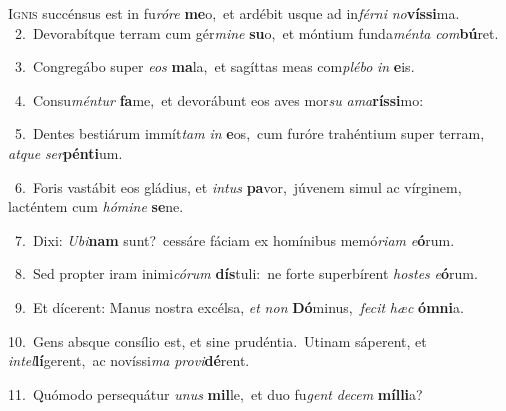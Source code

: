 \lettrine{\initial\textcolor{\initialcolor}{I}}{gnis} succénsus est in fu\-\textit{ró}\-\textit{re} \textbf{me}\-o,~\star et ardébit usque ad in\-\textit{fér}\-\textit{ni} \textit{no}\-\textbf{vís}\textbf{si}ma.\\
{\numbfont\textcolor{\numbcolor}{~2.}}~Devorabítque terram cum gér\-\textit{mi}\-\textit{ne} \textbf{su}\-o,~\star et móntium funda\-\textit{mén}\-\textit{ta} \textit{com}\-\textbf{bú}ret.\par
{\numbfont\textcolor{\numbcolor}{~3.}}~Congregábo super \textit{e}\-\textit{os} \textbf{ma}\-la,~\star et sagíttas meas com\-\textit{plé}\-\textit{bo} \textit{in} \textbf{e}\-is.\par
{\numbfont\textcolor{\numbcolor}{~4.}}~Consu\-\textit{mén}\-\textit{tur} \textbf{fa}\-me,~\star et devorábunt eos aves mor\textit{su} \textit{a}\-\textit{ma}\textbf{rís}\textbf{si}mo:\par
{\numbfont\textcolor{\numbcolor}{~5.}}~Dentes bestiárum immít\textit{tam} \textit{in} \textbf{e}\-os,~\star cum furóre trahéntium super terram, \textit{at}\-\textit{que} \textit{ser}\-\textbf{pén}\textbf{ti}um.\par
{\numbfont\textcolor{\numbcolor}{~6.}}~Foris vastábit eos gládius, et \textit{in}\-\textit{tus} \textbf{pa}\-vor,~\star júvenem simul ac vírginem, lacténtem cum \textit{hó}\-\textit{mi}\textit{ne} \textbf{se}\-ne.\par
{\numbfont\textcolor{\numbcolor}{~7.}}~Dixi: \textit{U}\-\textit{bi}\textbf{nam} sunt?~\star cessáre fáciam ex homínibus memó\-\textit{ri}\-\textit{am} \textit{e}\-\textbf{ó}rum.\par
{\numbfont\textcolor{\numbcolor}{~8.}}~Sed propter iram inimi\-\textit{có}\-\textit{rum} \textbf{dís}\-tuli:~\star ne forte superbírent \textit{hos}\-\textit{tes} \textit{e}\-\textbf{ó}rum.\par
{\numbfont\textcolor{\numbcolor}{~9.}}~Et dícerent: Manus nostra excélsa, \textit{et} \textit{non} \textbf{Dó}\-minus,~\star \textit{fe}\-\textit{cit} \textit{hæc} \textbf{óm}\-\textbf{ni}a.\par
{\numbfont\textcolor{\numbcolor}{10.}}~Gens absque consílio est, et sine prudéntia.~\dagger Utinam sáperent, et \textit{in}\-\textit{tel}\textbf{lí}gerent,~\star ac novíssi\textit{ma} \textit{pro}\-\textit{vi}\textbf{dé}rent.\par
{\numbfont\textcolor{\numbcolor}{11.}}~Quómodo persequátur \textit{u}\-\textit{nus} \textbf{mil}\-le,~\star et duo fu\textit{gent} \textit{de}\-\textit{cem} \textbf{míl}\-\textbf{li}a?\par
